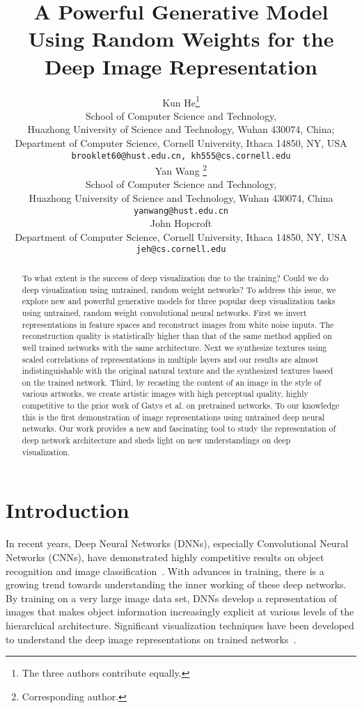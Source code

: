 \documentclass{article}
\title{A Powerful Generative Model Using Random Weights for the Deep Image Representation}
\author{
  Kun He\thanks{
  The three authors contribute equally. } \\
  School of Computer Science and Technology, \\
  Huazhong University of Science and Technology,
  Wuhan 430074, China;\\
  Department of Computer Science, Cornell University, Ithaca 14850, NY, USA  \\
  \texttt{brooklet60@hust.edu.cn, kh555@cs.cornell.edu} \\
  \AND
  Yan Wang \thanks{Corresponding author.}\\
 School of Computer Science and Technology, \\
 Huazhong University of Science and Technology,
 Wuhan 430074, China \\
 \texttt{yanwang@hust.edu.cn} \\
 \AND
  John Hopcroft \\
  Department of Computer Science,
  Cornell University, Ithaca 14850, NY, USA \\
  \texttt{jeh@cs.cornell.edu} \\
}
\begin{document}

\maketitle

\begin{abstract}
To what extent is the success of deep visualization due to the training? Could we do deep visualization using untrained, random weight networks? To address this issue, we explore new and powerful generative models for three popular deep visualization tasks using untrained, random weight convolutional neural networks. First we invert representations in feature spaces and reconstruct images from white noise inputs. The reconstruction quality is statistically higher than that of the same method applied on well trained networks with the same architecture. Next we synthesize textures using scaled correlations of representations in multiple layers and our results are almost indistinguishable with the original natural texture and the synthesized textures based on the trained network. Third, by recasting the content of an image in the style of various artworks, we create artistic images with high perceptual quality, highly competitive to the prior work of Gatys et al. on pretrained networks. To our knowledge this is the first demonstration of image representations using untrained deep neural networks. Our work provides a new and fascinating tool to study the representation of deep network architecture and sheds light on new understandings on deep visualization.
\end{abstract}


\section{Introduction}
\label{sec:introduction}

In recent years, Deep Neural Networks (DNNs), especially Convolutional Neural Networks (CNNs), have demonstrated highly competitive results on object recognition and image classification~\cite{ILSVRC,Alex2012NIPS,Simonyan14VGG,He2015Residual}.
With advances in training,  there is a growing trend towards %
understanding the inner working of these deep networks.
By training on a very large image data set, DNNs develop a representation of images that makes object information increasingly explicit at various levels of the hierarchical architecture.
Significant visualization techniques have been developed to understand the deep image representations on trained networks~\cite{Erhan2009, Simonyan13Visualise,Mahendran2015CVPR, Gatys2015texture, yosinski2015ICML,Dosovitskiy2015inverting,nguyen2015deepFool}.
\end{document}
